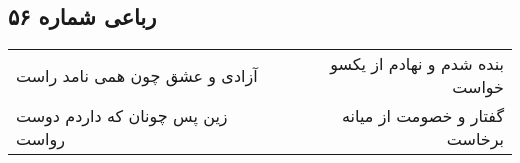 \begin{center}
\section*{رباعی شماره ۵۶}
\label{sec:sh056}
\begin{longtable}{l p{0.5cm} r}
آزادی و عشق چون همی نامد راست
&&
بنده شدم و نهادم از یکسو خواست
\\
زین پس چونان که داردم دوست رواست
&&
گفتار و خصومت از میانه برخاست
\\
\end{longtable}
\end{center}
